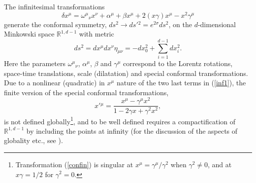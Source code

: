 \documentclass[a4paper,12pt]{article}
\def\R{\mathbb R}
\begin{document}
The infinitesimal transformations
\begin{equation}
\delta x^\mu = \omega^\mu{}_\nu x^\nu  + \alpha^\mu + \beta
x^\mu +
2(x\gamma)x^\mu - x^2\gamma^\mu
\label{inf1}
\end{equation}
generate the conformal symmetry,
$ds^2\rightarrow ds'{}^2=e^{2\sigma}ds^2$,
on the
$d$-dimensional Minkowski space $\R^{1,d-1}$
with metric
$$
ds^2=dx^\mu dx^\nu\eta_{\mu\nu}=-dx_0^2+\sum_{i=1}^{d-1}dx^{
2}_i.
$$
Here
the parameters
$\omega^\mu{}_\nu$,
$\alpha^\mu$,
$\beta$
and $\gamma^\mu$ correspond
to the Lorentz rotations,
space-time translations,
scale (dilatation) and special conformal transformations.
Due to a nonlinear (quadratic) in $x^\mu$
nature of the two  last terms in (\ref{inf1}),
the finite version of the special
conformal transformations,
\begin{equation}
x'{}^\mu=\frac{x^\mu-\gamma^\mu x^2}{1
-2\gamma x + \gamma^2 x^2},
\label{confin}
\end{equation}
is not defined globally\footnote{
Transformation (\ref{confin}) is singular at
$x^\mu=\gamma^\mu/\gamma^2$ when
$\gamma^2\neq 0$,
and at $x\gamma=1/2$
for $\gamma^2=0$.},
and to be well defined requires a
compactification of $\R^{1,d-1}$
by including the points at infinity
(for the discussion of the aspects of globality etc.,
see \cite{HE,WitE,Ahar}).
\end{document}

